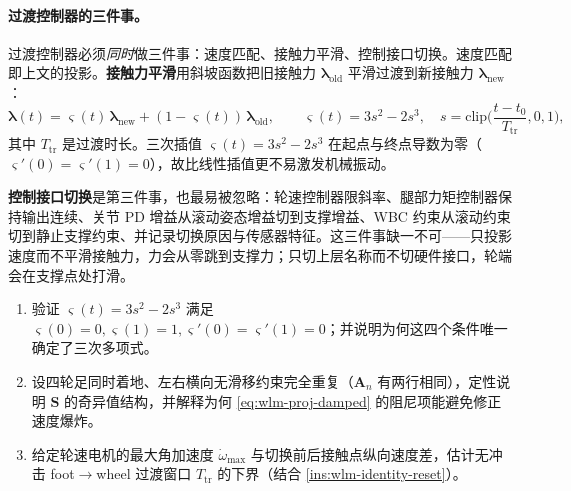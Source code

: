 \paragraph{过渡控制器的三件事。}
过渡控制器必须\emph{同时}做三件事：速度匹配、接触力平滑、控制接口切换。速度匹配即上文的投影。\textbf{接触力平滑}用斜坡函数把旧接触力 $\boldsymbol\lambda_{\mathrm{old}}$ 平滑过渡到新接触力 $\boldsymbol\lambda_{\mathrm{new}}$：
\begin{equation}
  \boldsymbol\lambda(t)=\varsigma(t)\,\boldsymbol\lambda_{\mathrm{new}}+(1-\varsigma(t))\,\boldsymbol\lambda_{\mathrm{old}},\qquad
  \varsigma(t)=3s^2-2s^3,\quad s=\mathrm{clip}\!\Big(\frac{t-t_0}{T_{\mathrm{tr}}},0,1\Big),
  \label{eq:wlm-force-ramp}
\end{equation}
其中 $T_{\mathrm{tr}}$ 是过渡时长。三次插值 $\varsigma(t)=3s^2-2s^3$ 在起点与终点导数为零（$\varsigma'(0)=\varsigma'(1)=0$），故比线性插值更不易激发机械振动。

\begin{center}
\small
{}
\end{center}

\noindent\textbf{控制接口切换}是第三件事，也最易被忽略：轮速控制器限斜率、腿部力矩控制器保持输出连续、关节 PD 增益从滚动姿态增益切到支撑增益、WBC 约束从滚动约束切到静止支撑约束、并记录切换原因与传感器特征。这三件事缺一不可——只投影速度而不平滑接触力，力会从零跳到支撑力；只切上层名称而不切硬件接口，轮端会在支撑点处打滑。

\begin{practice}
\begin{enumerate}
  \item 验证 $\varsigma(t)=3s^2-2s^3$ 满足 $\varsigma(0)=0,\varsigma(1)=1,\varsigma'(0)=\varsigma'(1)=0$；并说明为何这四个条件唯一确定了三次多项式。
  \item 设四轮足同时着地、左右横向无滑移约束完全重复（$\mathbf A_n$ 有两行相同），定性说明 $\mathbf S$ 的奇异值结构，并解释为何 \cref{eq:wlm-proj-damped} 的阻尼项能避免修正速度爆炸。
  \item 给定轮速电机的最大角加速度 $\dot\omega_{\max}$ 与切换前后接触点纵向速度差，估计无冲击 foot$\to$wheel 过渡窗口 $T_{\mathrm{tr}}$ 的下界（结合 \cref{ins:wlm-identity-reset}）。
\end{enumerate}
\end{practice}


